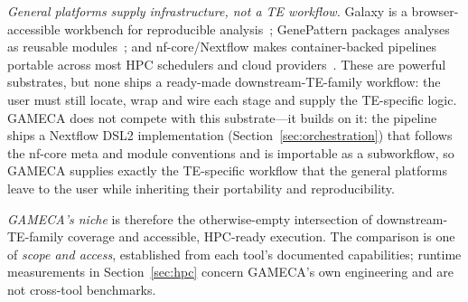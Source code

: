 \documentclass[11pt]{article}
\begin{document}
\emph{General platforms supply infrastructure, not a TE workflow.} Galaxy is a
browser-accessible workbench for reproducible analysis~\citep{galaxy2022}; GenePattern
packages analyses as reusable modules~\citep{genepattern2006}; and nf-core/Nextflow makes
container-backed pipelines portable across most HPC schedulers and cloud
providers~\citep{ewels2020,ditommaso2017}. These are powerful substrates, but none ships a
ready-made downstream-TE-family workflow: the user must still locate, wrap and wire each
stage and supply the TE-specific logic. GAMECA does not compete with this substrate---it
builds on it: the pipeline ships a Nextflow DSL2 implementation
(Section~\ref{sec:orchestration}) that follows the nf-core meta and module conventions and is
importable as a subworkflow, so GAMECA supplies exactly the TE-specific workflow that the
general platforms leave to the user while inheriting their portability and reproducibility.

\emph{GAMECA's niche} is therefore the otherwise-empty intersection of downstream-TE-family
coverage and accessible, HPC-ready execution. The comparison is one of \emph{scope and
access}, established from each tool's documented capabilities; runtime measurements in
Section~\ref{sec:hpc} concern GAMECA's own engineering and are not cross-tool benchmarks.
\end{document}
